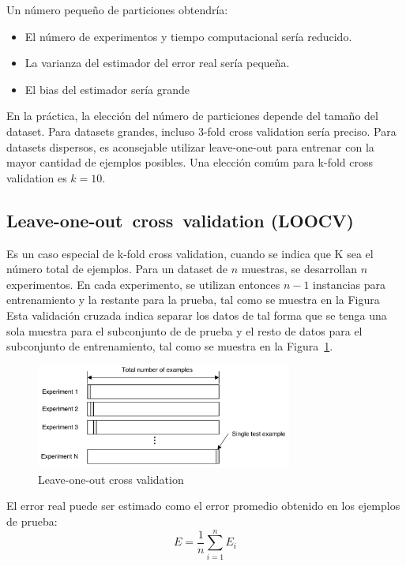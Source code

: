 \documentclass{article}
\begin{document}
Un número pequeño de particiones obtendría:
\begin{itemize}
	\item \checkmark El número de experimentos y tiempo computacional sería reducido.
	\item \checkmark La varianza del estimador del error real sería pequeña.
	\item \texttimes El bias del estimador sería grande
\end{itemize}

En la práctica, la elección del número de particiones depende del tamaño del dataset.
Para datasets grandes, incluso 3-fold cross validation sería preciso.
Para datasets dispersos, es aconsejable utilizar leave-one-out para entrenar con la mayor cantidad de ejemplos posibles. Una elección comúm para k-fold cross validation es $k=10$.


\subsection{Leave-­one-out cross validation (LOOCV)}
Es un caso especial de k-fold cross validation, cuando se indica que K sea el número total de ejemplos.
Para un dataset de $n$ muestras, se desarrollan $n$ experimentos.
En cada experimento, se utilizan entonces $n-1$ instancias para entrenamiento y la restante para la prueba, tal como se muestra en la Figura 
Esta validación cruzada indica separar los datos de tal forma que se tenga una sola muestra para el subconjunto de de prueba y el resto de datos para el subconjunto de entrenamiento, tal como se muestra en la Figura~\ref{fig:leave-one-out-validation}.
\begin{figure}
	\centering
	\includegraphics[width=0.75\textwidth]{resources/images/leave-one-out}
	\caption{Leave-one-out cross validation}
	\label{fig:leave-one-out-validation}
\end{figure}

El error real puede ser estimado como el error promedio obtenido en los ejemplos de prueba:
$$
	E = \frac{1}{n} \sum_{i=1}^n E_{i}
$$
\end{document}
